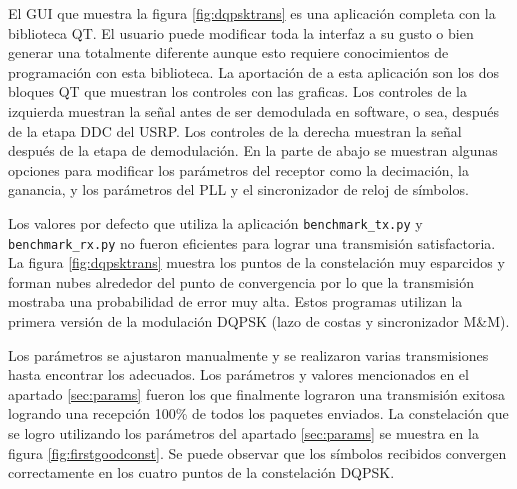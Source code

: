 El GUI que muestra la figura \ref{fig:dqpsktrans} es una aplicaci\'on completa con la biblioteca QT.
El usuario puede modificar toda la interfaz a su gusto o bien generar una totalmente diferente aunque
esto requiere conocimientos de programaci\'on con esta biblioteca. La aportaci\'on de \gnuradio a
esta aplicaci\'on son los dos bloques QT que muestran los controles con las graficas. Los controles
de la izquierda muestran la se\~nal antes de ser demodulada en software, o sea, despu\'es de la
etapa DDC del USRP. Los controles de la derecha muestran la se\~nal despu\'es de la etapa de
demodulaci\'on. En la parte de abajo se muestran algunas opciones para modificar los par\'ametros
del receptor como la decimaci\'on, la ganancia, y los par\'ametros del PLL y el sincronizador de
reloj de s\'imbolos.

Los valores por defecto que utiliza la aplicaci\'on \verb|benchmark_tx.py| y \\
\verb|benchmark_rx.py| no fueron eficientes para lograr una transmisi\'on satisfactoria. La figura
\ref{fig:dqpsktrans} muestra los puntos de la constelaci\'on muy esparcidos y forman nubes alrededor
del punto de convergencia por lo que la transmisi\'on mostraba una probabilidad de error muy alta.
Estos programas utilizan la primera versi\'on de la modulaci\'on DQPSK (lazo de costas y sincronizador
M\&M).

Los par\'ametros se ajustaron manualmente y se realizaron varias transmisiones hasta encontrar
los adecuados. Los par\'ametros y valores mencionados en el apartado \ref{sec:params} fueron los que
finalmente lograron una transmisi\'on exitosa logrando una recepci\'on 100\% de todos los paquetes
enviados. La constelaci\'on que se logro utilizando los par\'ametros del apartado \ref{sec:params}
se muestra en la figura \ref{fig:firstgoodconst}. Se puede observar que los s\'imbolos recibidos
convergen correctamente en los cuatro puntos de la constelaci\'on DQPSK.

